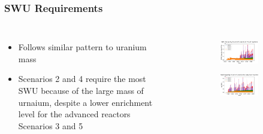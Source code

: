 \begin{frame}
\end{frame}

\begin{frame}
    \frametitle{\gls{SWU} Requirements}
    \begin{columns}
        \column[t]{5cm}
            \begin{itemize}
                \item Follows similar pattern to uranium mass 
                \item Scenarios 2 and 4 require the most \gls{SWU} 
                      because of the large mass of urnaium, despite a 
                      lower enrichment level for the advanced reactors 
                      Scenarios 3 and 5
                
            \end{itemize}
        \column[t]{5cm}
        \vspace{-1cm}
        \begin{figure}
            \centering 
            \begin{subfigure}
                \centering
                \includegraphics[height=0.35\textheight]{figures/totalswu_scenarios_all.png}
                \label{fig:swu_all}
            \end{subfigure}
            \vspace{-0.5cm}
            \begin{subfigure}
                \centering
                \includegraphics[height=0.35\textheight]{figures/haleuSWU_scenarios_all.png}

\end{subfigure}
\end{figure}
\end{columns}
\end{frame}
